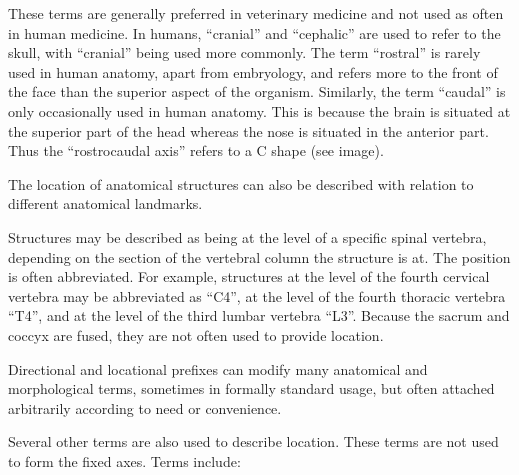These terms are generally preferred in veterinary medicine and not used as often in human medicine. In humans, ``cranial'' and ``cephalic'' are used to refer to the skull, with ``cranial'' being used more commonly. The term ``rostral'' is rarely used in human anatomy, apart from embryology, and refers more to the front of the face than the superior aspect of the organism. Similarly, the term ``caudal'' is only occasionally used in human anatomy. This is because the brain is situated at the superior part of the head whereas the nose is situated in the anterior part. Thus the ``rostrocaudal axis'' refers to a C shape (see image).

The location of anatomical structures can also be described with relation to different anatomical landmarks.

Structures may be described as being at the level of a specific spinal vertebra, depending on the section of the vertebral column the structure is at. The position is often abbreviated. For example, structures at the level of the fourth cervical vertebra may be abbreviated as ``C4'', at the level of the fourth thoracic vertebra ``T4'', and at the level of the third lumbar vertebra ``L3''. Because the sacrum and coccyx are fused, they are not often used to provide location.

Directional and locational prefixes can modify many anatomical and morphological terms, sometimes in formally standard usage, but often attached arbitrarily according to need or convenience.

Several other terms are also used to describe location. These terms are not used to form the fixed axes. Terms include:

